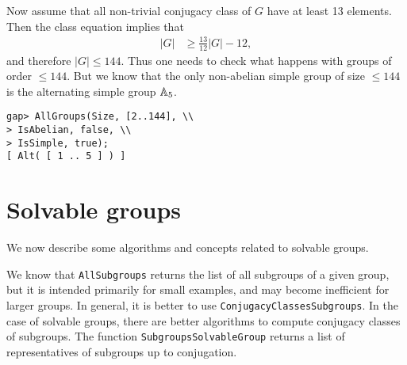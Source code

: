 Now assume that all non-trivial conjugacy class of $G$ have at least 13 elements. 
Then the class equation implies that
\begin{align*}
	|G|&\geq \frac{13}{12}|G|-12,
\end{align*}
and therefore $|G|\leq 144$. Thus one needs to check what happens with groups
of order $\leq 144$. 
But we know that the only non-abelian simple group of size
$\leq 144$ is the alternating simple group $\mathbb{A}_5$.
\begin{lstlisting}
gap> AllGroups(Size, [2..144], \\
> IsAbelian, false, \\
> IsSimple, true);
[ Alt( [ 1 .. 5 ] ) ]
\end{lstlisting}

\section{Solvable groups}

We now describe some algorithms and concepts 
related to solvable groups. 

We know that \lstinline{AllSubgroups} returns the list of all subgroups 
of a given group, but it is intended primarily for small examples, and 
may become inefficient for larger groups.
In general, it is better to use 
\lstinline{ConjugacyClassesSubgroups}. In the case of solvable
groups, there are better algorithms to compute conjugacy classes
of subgroups. The function 
\lstinline{SubgroupsSolvableGroup} returns a list of
representatives of 
subgroups up to conjugation. 

